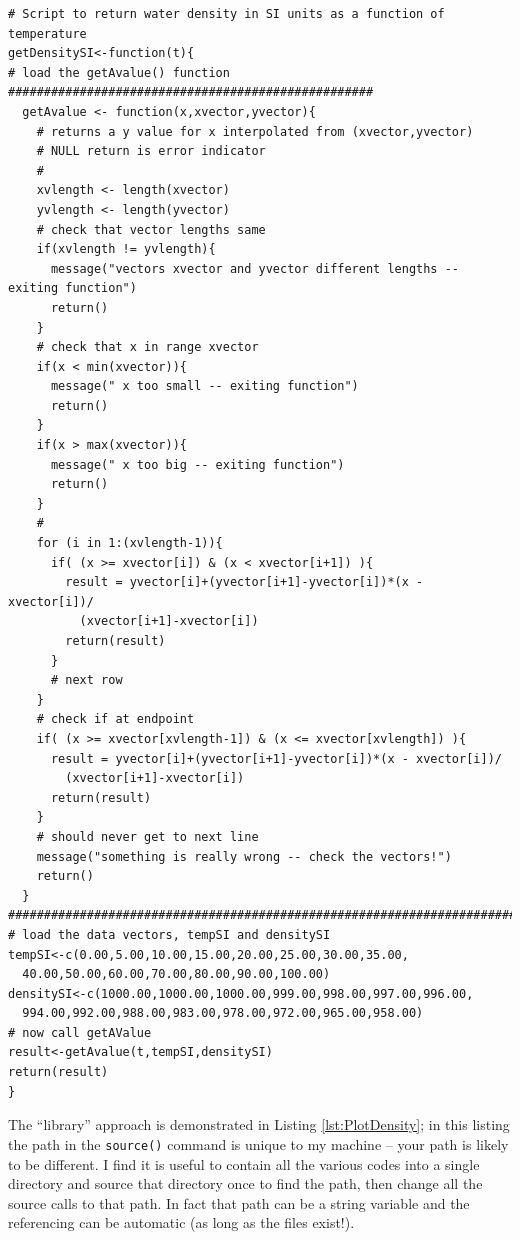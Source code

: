 \begin{lstlisting}[caption=R code to Return Water Density for Given Temperature, label=lst:getDensitySI]
# Script to return water density in SI units as a function of temperature
getDensitySI<-function(t){
# load the getAvalue() function ###################################################
  getAvalue <- function(x,xvector,yvector){
    # returns a y value for x interpolated from (xvector,yvector)
    # NULL return is error indicator
    #
    xvlength <- length(xvector)
    yvlength <- length(yvector)
    # check that vector lengths same
    if(xvlength != yvlength){
      message("vectors xvector and yvector different lengths -- exiting function")
      return()
    }
    # check that x in range xvector
    if(x < min(xvector)){
      message(" x too small -- exiting function")
      return()
    }
    if(x > max(xvector)){
      message(" x too big -- exiting function")
      return()
    }
    #
    for (i in 1:(xvlength-1)){
      if( (x >= xvector[i]) & (x < xvector[i+1]) ){
        result = yvector[i]+(yvector[i+1]-yvector[i])*(x - xvector[i])/
          (xvector[i+1]-xvector[i])
        return(result)
      }
      # next row  
    }
    # check if at endpoint
    if( (x >= xvector[xvlength-1]) & (x <= xvector[xvlength]) ){
      result = yvector[i]+(yvector[i+1]-yvector[i])*(x - xvector[i])/
        (xvector[i+1]-xvector[i])
      return(result)
    }
    # should never get to next line
    message("something is really wrong -- check the vectors!")
    return()
  }
#########################################################################################
# load the data vectors, tempSI and densitySI
tempSI<-c(0.00,5.00,10.00,15.00,20.00,25.00,30.00,35.00,
  40.00,50.00,60.00,70.00,80.00,90.00,100.00)
densitySI<-c(1000.00,1000.00,1000.00,999.00,998.00,997.00,996.00,
  994.00,992.00,988.00,983.00,978.00,972.00,965.00,958.00)
# now call getAValue
result<-getAvalue(t,tempSI,densitySI)
return(result)
}
  \end{lstlisting}  

The ``library'' approach is demonstrated in Listing \ref{lst:PlotDensity}; in this listing the path in the \texttt{source()} command is unique to my machine -- your path is likely to be different.  I find it is useful to contain all the various codes into a single directory and source that directory once to find the path, then change all the source calls to that path.  In fact that path can be a string variable and the referencing can be automatic (as long as the files exist!).

